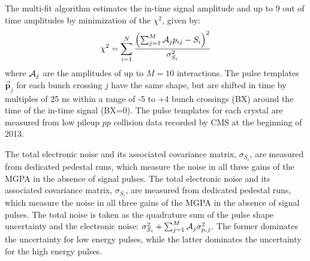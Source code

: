 \documentclass[journal]{IEEEtran}
\begin{document}
The multi-fit algorithm estimates the in-time signal amplitude and up to 9 out of time amplitudes by minimization of the $\chi^2$, given by:
\begin{equation}
\label{eqn:chi2multifit}
\chi^2 = \sum_{i=1}^{N} \frac{\left(\sum_{j=1}^M {\cal A}_{j}p_{ij} - S_i \right)^2}{\sigma^2_{S_i}}
\end{equation}
where ${\cal A}_{j}$ are the amplitudes of up to $M=10$ interactions. The pulse templates $\mathbf{\vec p}_j$ for each bunch crossing $j$ have the same shape, but are shifted in time by multiples of 25 ns within a range of -5 to +4 bunch crossings (BX) around the time of the in-time signal (BX=0). The pulse templates for each crystal are measured from low pileup $pp$ collision data recorded by CMS at the beginning of 2013. 

The total electronic noise and its associated covariance matrix, $\sigma_{S_i}$, are measured from dedicated pedestal runs, which measure the noise in all three gains of the MGPA in the absence of signal pulses. The total electronic noise and its associated covariance matrix, $\sigma_{S_i}$, are measured from dedicated pedestal runs, which measure the noise in all three gains of the MGPA in the absence of signal pulses. The total noise is taken as the quadrature sum of the pulse shape uncertainty and the electronic noise: $\sigma_{S_i}^2+\sum_{j=1}^M {\cal A}_{j}\sigma_{p_ij}^2$. The former dominates the uncertainty for low energy pulses, while the latter dominates the uncertainty for the high energy pulses.
\end{document}

